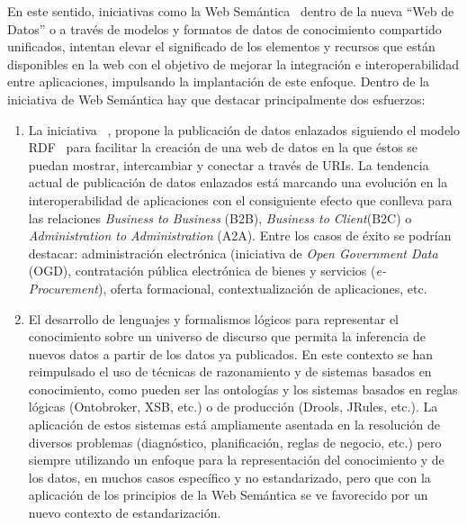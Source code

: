 En este sentido, iniciativas como la Web Semántica~\cite{Berners-Lee2001} dentro de la nueva ``Web de Datos'' o \wode a través de modelos y
formatos de datos de conocimiento compartido unificados, intentan elevar el
significado de los elementos y recursos que están disponibles en la web con el
objetivo de mejorar la integración e interoperabilidad entre aplicaciones, impulsando la implantación de este enfoque. Dentro de la iniciativa de Web
Semántica hay que destacar principalmente dos esfuerzos: 
\begin{enumerate}
 \item La iniciativa \linkeddata~\cite{Berners-Lee-2006}, propone la publicación de datos
enlazados siguiendo el modelo \gls{RDF}~\cite{rdf-syntax} para facilitar la creación de una web de
datos en la que éstos se puedan mostrar, intercambiar y conectar a través de
URIs. La tendencia actual de publicación de datos enlazados está marcando una
evolución en la interoperabilidad de aplicaciones con el consiguiente efecto que
conlleva para las relaciones \textit{Business to Business} (\gls{B2B}), \textit{Business to
Client}(\gls{B2C}) o \textit{Administration to Administration} (\gls{A2A}). Entre los casos de éxito
se podrían destacar: administración electrónica (iniciativa de \textit{Open Government
Data}~\cite{8-principles} (\gls{OGD}), contratación pública electrónica de bienes y servicios (\textit{\gls{e-Procurement}}), oferta
formacional, contextualización de aplicaciones, etc. 

\item El desarrollo de lenguajes y formalismos lógicos para representar el
conocimiento sobre un universo de discurso que permita la inferencia de nuevos
datos a partir de los datos ya publicados. En este contexto se han reimpulsado
el uso de técnicas de razonamiento y de sistemas basados en conocimiento, 
como pueden ser las ontologías y los sistemas basados en reglas lógicas (Ontobroker,
XSB, etc.) o de producción (Drools, JRules, etc.). La aplicación de estos
sistemas está ampliamente asentada en la resolución de diversos problemas
(diagnóstico, planificación, reglas de negocio, etc.) pero siempre utilizando un
enfoque para la representación del conocimiento y de los datos, en muchos casos
específico y no estandarizado, pero que con la aplicación de los principios
de la Web Semántica se ve favorecido por un nuevo contexto de estandarización. 
\end{enumerate}

